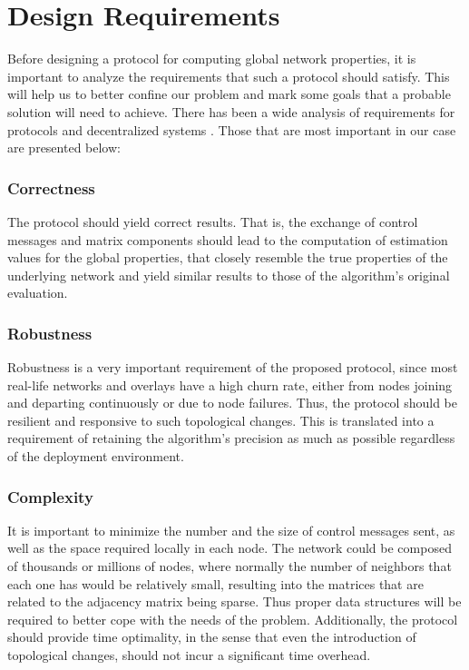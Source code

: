 \documentclass[MSc]{icldt}
\begin{document}
\section{Design Requirements}

Before designing a protocol for computing global network properties, it is important to analyze the requirements that such a protocol should satisfy. This will help us to better confine our problem and mark some goals that a probable solution will need to achieve. There has been a wide analysis of requirements for protocols and decentralized systems \cite{Rose01onthe} \cite{Kendall:1994:NDC:974938}. Those that are most important in our case are presented below:


\subsubsection*{Correctness}

The protocol should yield correct results. That is, the exchange of control messages and matrix components should lead to the computation of estimation values for the global properties, that closely resemble the true properties of the underlying network and yield similar results to those of the algorithm's original evaluation.

\subsubsection*{Robustness}

Robustness is a very important requirement of the proposed protocol, since most real-life networks and overlays have a high churn rate, either from nodes joining and departing continuously or due to node failures. Thus, the protocol should be resilient and responsive to such topological changes. This is translated into a requirement of retaining the algorithm's precision as much as possible regardless of the deployment environment. 

\subsubsection*{Complexity}

It is important to minimize the number and the size of control messages sent, as well as the space required locally in each node. The network could be composed of thousands or millions of nodes, where normally the number of neighbors that each one has would be relatively small, resulting into the matrices that are related to the adjacency matrix being sparse. Thus proper data structures will be required to better cope with the needs of the problem. Additionally, the protocol should provide time optimality, in the sense that even the introduction of topological changes, should not incur a significant time overhead. 
\end{document}
